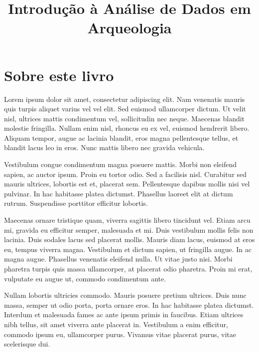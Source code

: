 \documentclass[
  letterpaper,
  DIV=11,
  numbers=noendperiod]{scrreprt}
\title{Introdução à Análise de Dados em Arqueologia}
\author{}
\date{}
\renewcommand*\contentsname{Table of contents}
\newcommand\contentsname{Table of contents}
\begin{document}
\maketitle

\renewcommand*\contentsname{Table of contents}
{
\hypersetup{linkcolor=}
\setcounter{tocdepth}{2}
\tableofcontents
}


\chapter*{Sobre este livro}\label{sobre-este-livro}


Lorem ipsum dolor sit amet, consectetur adipiscing elit. Nam venenatis
mauris quis turpis aliquet varius vel vel elit. Sed euismod ullamcorper
dictum. Ut velit nisl, ultrices mattis condimentum vel, sollicitudin nec
neque. Maecenas blandit molestie fringilla. Nullam enim nisl, rhoncus eu
ex vel, euismod hendrerit libero. Aliquam tempor, augue ac lacinia
blandit, eros magna pellentesque tellus, et blandit lacus leo in eros.
Nunc mattis libero nec gravida vehicula.

Vestibulum congue condimentum magna posuere mattis. Morbi non eleifend
sapien, ac auctor ipsum. Proin eu tortor odio. Sed a facilisis nisl.
Curabitur sed mauris ultrices, lobortis est et, placerat sem.
Pellentesque dapibus mollis nisi vel pulvinar. In hac habitasse platea
dictumst. Phasellus laoreet elit at dictum rutrum. Suspendisse porttitor
efficitur lobortis.

Maecenas ornare tristique quam, viverra sagittis libero tincidunt vel.
Etiam arcu mi, gravida eu efficitur semper, malesuada et mi. Duis
vestibulum mollis felis non lacinia. Duis sodales lacus sed placerat
mollis. Mauris diam lacus, euismod at eros eu, tempus viverra magna.
Vestibulum et dictum sapien, ut fringilla augue. In ac magna augue.
Phasellus venenatis eleifend nulla. Ut vitae justo nisi. Morbi pharetra
turpis quis massa ullamcorper, at placerat odio pharetra. Proin mi erat,
vulputate eu augue ut, commodo condimentum ante.

Nullam lobortis ultricies commodo. Mauris posuere pretium ultrices. Duis
nunc massa, semper ut odio porta, porta ornare eros. In hac habitasse
platea dictumst. Interdum et malesuada fames ac ante ipsum primis in
faucibus. Etiam ultrices nibh tellus, sit amet viverra ante placerat in.
Vestibulum a enim efficitur, commodo ipsum eu, ullamcorper purus.
Vivamus vitae placerat purus, vitae scelerisque dui.
\end{document}
